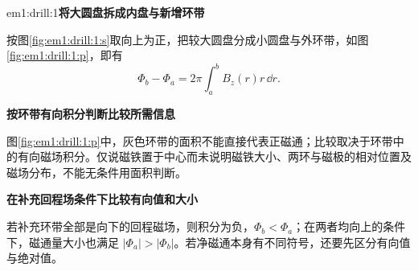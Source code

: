 \LectureAnswerSection

\begin{drillsolution}{em1:drill:1}\textbf{将大圆盘拆成内盘与新增环带}\par\nobreak
按图\ref{fig:em1:drill:1:s}取向上为正，把较大圆盘分成小圆盘与外环带，如图\ref{fig:em1:drill:1:p}，即有
\[\Phi_b-\Phi_a=2\pi\int_a^b B_z(r)r\,\dd r.\]



\par\medskip{}\noindent\textbf{按环带有向积分判断比较所需信息}\par\nobreak
图\ref{fig:em1:drill:1:p}中，灰色环带的面积不能直接代表正磁通；比较取决于环带中的有向磁场积分。仅说磁铁置于中心而未说明磁铁大小、两环与磁极的相对位置及磁场分布，不能无条件用面积判断。



\par\medskip{}\noindent\textbf{在补充回程场条件下比较有向值和大小}\par\nobreak
若补充环带全部是向下的回程磁场，则积分为负，$\Phi_b<\Phi_a$；在两者均向上的条件下，磁通量大小也满足 $|\Phi_a|>|\Phi_b|$。若净磁通本身有不同符号，还要先区分有向值与绝对值。\end{drillsolution}
